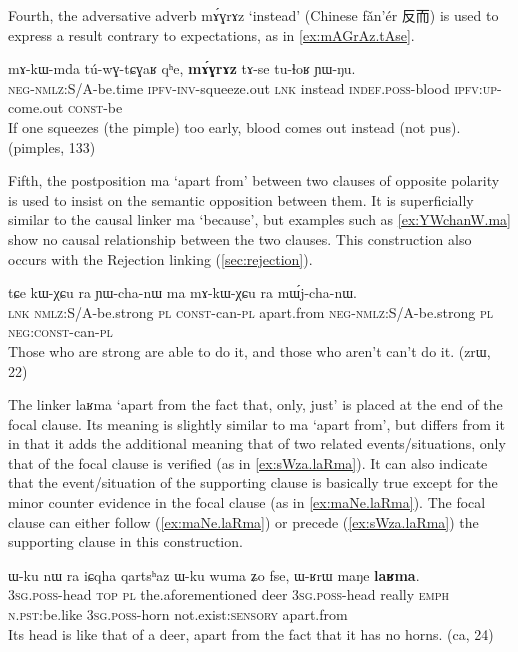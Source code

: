 \documentclass[oldfontcommands,oneside,a4paper,11pt]{article}
\newcommand{\ipa}[1]{{\phon \mbox{#1}}} %
\newcommand{\zh}[1]{{\cn #1}}
\begin{document}
Fourth, the adversative adverb \ipa{mɤ́ɣrɤz} `instead' (Chinese \ipa{fǎn'ér} \zh{反而}) is used to express a result contrary to expectations, as in  \ref{ex:mAGrAz.tAse}.  

\begin{exe}
\ex \label{ex:mAGrAz.tAse}
\gll
 \ipa{mɤ-kɯ-mda}    	\ipa{tú-wɣ-tɕɣaʁ}    	\ipa{qʰe,}    	\ipa{\textbf{mɤ́ɣrɤz}}    	\ipa{tɤ-se}    	\ipa{tu-ɬoʁ}    	\ipa{ɲɯ-ŋu.}    \\
 \textsc{neg-nmlz:S/A}-be.time \textsc{ipfv-inv}-squeeze.out \textsc{lnk} instead \textsc{indef.poss}-blood \textsc{ipfv:up}-come.out \textsc{const}-be  \\
\glt If one squeezes (the pimple) too early, blood comes out instead (not pus). (pimples, 133)
 \end{exe}
 

Fifth, the  postposition \ipa{ma} `apart from' between two clauses of opposite polarity is used to insist on the semantic opposition between them.  It is superficially similar to the causal linker \ipa{ma} `because', but   examples such as \ref{ex:YWchanW.ma} show no causal relationship between the two clauses. This construction  also occurs with the Rejection linking (\ref{sec:rejection}).
\begin{exe}
\ex \label{ex:YWchanW.ma}
\gll
\ipa{tɕe}  	\ipa{kɯ-χɕu}  	\ipa{ra}  	\ipa{ɲɯ-cha-nɯ}  	\ipa{ma}  	\ipa{mɤ-kɯ-χɕu}  	\ipa{ra}  	\ipa{mɯ́j-cha-nɯ.}  \\
\textsc{lnk} \textsc{nmlz}:S/A-be.strong \textsc{pl} \textsc{const}-can-\textsc{pl} apart.from \textsc{neg-nmlz}:S/A-be.strong \textsc{pl} \textsc{neg:const}-can-\textsc{pl} \\
\glt Those who are strong are able to do it, and those who aren't can't do it. (zrɯ, 22)
\end{exe}

The   linker  \ipa{laʁma} `apart from the fact that, only, just' is placed at the end of the focal clause. Its meaning is slightly similar to \ipa{ma} `apart from', but differs from it in that it adds the additional meaning that of two related events/situations, only that of the focal clause is verified (as in \ref{ex:sWza.laRma}). It can also indicate that the event/situation of the supporting clause is basically true except for the minor counter evidence in the focal clause  (as in \ref{ex:maNe.laRma}).   The focal clause can either follow (\ref{ex:maNe.laRma}) or precede (\ref{ex:sWza.laRma}) the supporting clause in this construction.
  \begin{exe}
\ex \label{ex:maNe.laRma}
\gll
\ipa{ɯ-ku}  	\ipa{nɯ} \ipa{ra}   	\ipa{iɕqha}  	\ipa{qartsʰaz}  	\ipa{ɯ-ku}  	\ipa{wuma}  	\ipa{ʑo}  	\ipa{fse,}  	\ipa{ɯ-ʁrɯ}  	\ipa{maŋe}  	\ipa{\textbf{laʁma}.}  	\\
\textsc{3sg.poss}-head \textsc{top} \textsc{pl} the.aforementioned deer \textsc{3sg.poss}-head  really \textsc{emph} \textsc{n.pst}:be.like \textsc{3sg.poss}-horn not.exist:\textsc{sensory} apart.from \\
\glt Its head is like that of a deer, apart from the fact that it has no  horns. (ca, 24)
\end{exe} 
\end{document}
